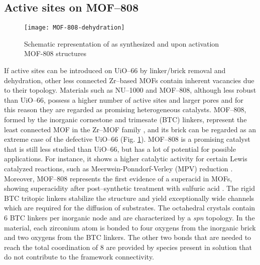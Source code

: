 \subsection*{Active sites on MOF--808}
\begin{figure}[!htbp]
	\centering
	\texttt{[image: MOF-808-dehydration]}
	\caption{Schematic representation of as synthesized and upon activation MOF-808 structures}
	\label{fig:MOF-808-dehydration}
\end{figure}
If active sites can be introduced on UiO--66 by linker/brick removal and dehydration, other less connected Zr--based MOFs contain inherent vacancies due to their topology. Materials such as NU--1000 and MOF--808, although less robust than UiO--66, possess a higher number of active sites and larger pores and for this reason they are regarded as promising heterogeneous catalysts. 
MOF--808, formed by the inorganic  cornestone and trimesate (BTC) linkers, represent the least connected MOF in the Zr--MOF family \cite{furukawa2014water}, and its brick can be regarded as an extreme case of the defective UiO--66 (Fig. \ref{fig:MOF-808-dehydration}). 
MOF--808 is a promising catalyst that is still less studied than UiO--66, but has a lot of potential for possible applications. For instance, it shows a higher catalytic activity for certain Lewis catalyzed reactions, such as Meerwein-Ponndorf-Verley (MPV) reduction \cite{plessers2016zr, mautschke2018catalytic}. Moreover, MOF--808 represents the first evidence of a superacid in MOFs, showing superacidity after post--synthetic treatment with sulfuric acid \cite{jiang2014superacidity}.
\npar
The rigid BTC tritopic linkers stabilize the structure and yield exceptionally wide channels which are required for the diffusion of substrates. The octahedral crystals contain 6 BTC linkers per inorganic node and are characterized by a \textit{spn} topology. 
In the material, each zirconium atom is bonded to four oxygens from the inorganic brick and two oxygens from the BTC linkers. The other two bonds that are needed to reach the total coordination of 8 are provided by species present in solution that do not contribute to the framework connectivity. 
\npar
